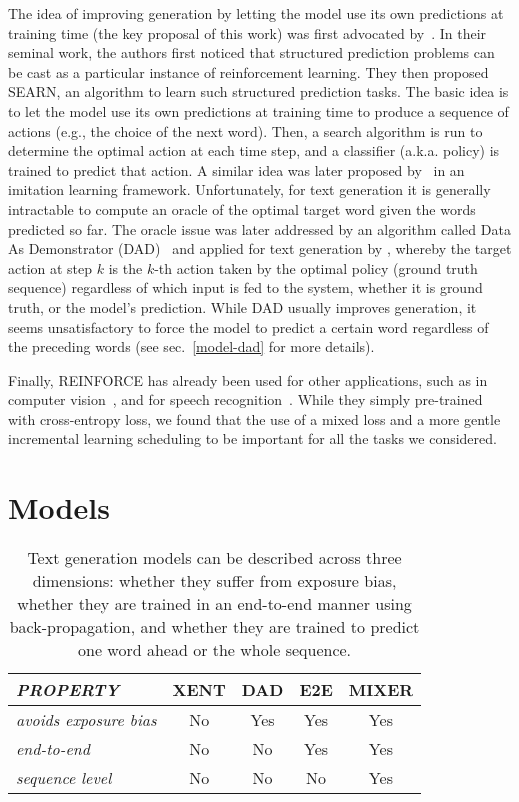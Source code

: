 \documentclass{article} \usepackage{iclr2016_conference,times}
\makeatletter
\newcommand*{\aka}{a.k.a.\@\xspace}
\makeatother
\begin{document}
The idea of improving generation by letting the model use its own predictions at training 
time (the key proposal of this work) was first advocated by~\citet{searn}. In their seminal 
work, the authors first noticed that structured prediction problems
can be cast as a particular instance of reinforcement learning. They then
proposed SEARN, an algorithm to learn such structured
prediction tasks. The basic idea is to let the model use its own
predictions at training time to produce a sequence of actions (e.g.,
the choice of the next word). Then, a search algorithm is
run to determine the optimal action at each time step, and a
classifier (\aka policy) is trained to predict that action. A similar idea was later
proposed by~\citet{dagger} in an imitation learning framework. 
Unfortunately, for text generation it is generally intractable to compute
an oracle of the optimal target word given the words predicted so far.
The oracle issue was later addressed by an algorithm called 
Data As Demonstrator (DAD)~\citep{dad} and applied for text generation by 
\cite{sbengio-nips2015}, whereby the target action at step $k$ is the
$k$-th action taken by the optimal policy (ground truth sequence) regardless of which
input is fed to the system, whether it is ground truth, or the model's
prediction. While DAD usually improves generation, it seems unsatisfactory to force 
the model to predict a certain word regardless of the preceding words 
(see sec.~\ref{model-dad} for more details). 

Finally, REINFORCE has already been used for other applications, such as in 
computer vision~\citep{vmnih-nips2014,xu-icml2015,ba_iclr15}, and for speech recognition~\cite{graves_icml14}. 
While they simply pre-trained with cross-entropy loss, we found that the use of a mixed loss and a more gentle incremental learning scheduling to be important for all the tasks we considered. \section{Models} \label{model}
\begin{table}[t]
	\footnotesize
    \caption{Text generation models can be described across three dimensions: whether they suffer from exposure bias, 
whether they are trained in an end-to-end manner using back-propagation, 
and whether they are trained to predict one word ahead or the whole sequence.}
    \begin{tabular}{l || c | c | c |c}
      \multicolumn{1}{l||}{\em PROPERTY}  & 
      \multicolumn{1}{l|}{XENT} &
      \multicolumn{1}{l|}{DAD} & \multicolumn{1}{c|}{E2E} & \multicolumn{1}{c}{MIXER}\\
      \hline
      \hline
      {\em avoids exposure bias} & No & Yes & Yes & Yes \\
      \hline
      {\em end-to-end} & No & No & Yes & Yes \\
      \hline
      {\em sequence level} & No & No & No & Yes \\
    \end{tabular}
\label{tab:model_comparison}
\end{table}
\end{document}
